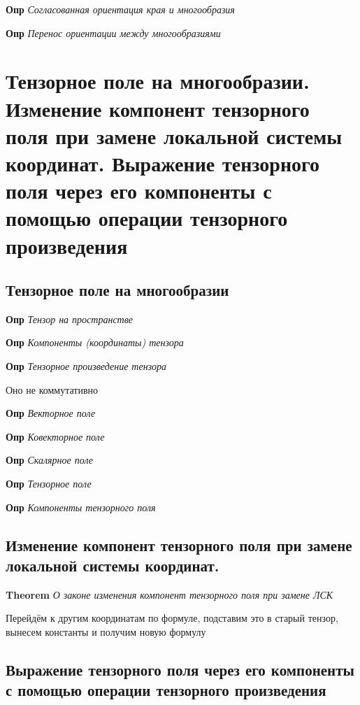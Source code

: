 \documentclass[a4paper, 14pt]{article}
\begin{document}
    \textbf{Опр} \textit{Согласованная ориентация края и многообразия}
    
    \textbf{Опр} \textit{Перенос ориентации между многообразиями}
    
    \section{Тензорное поле на многообразии.
    Изменение компонент тензорного поля при замене локальной системы координат.
    Выражение тензорного поля через его компоненты с помощью операции тензорного произведения}
    
    \subsection{Тензорное поле на многообразии}
    
    \textbf{Опр} \textit{Тензор на пространстве}
    
    \textbf{Опр} \textit{Компоненты (координаты) тензора}
    
    \textbf{Опр} \textit{Тензорное произведение тензора}
    
    Оно не коммутативно
    
    \textbf{Опр} \textit{Векторное поле}
    
    \textbf{Опр} \textit{Ковекторное поле}
    
    \textbf{Опр} \textit{Скалярное поле}
    
    \textbf{Опр} \textit{Тензорное поле}
    
    \textbf{Опр} \textit{Компоненты тензорного поля}
    
    \subsection{Изменение компонент тензорного поля при замене локальной системы координат.}
    
    \textbf{Theorem} \textit{О законе изменения компонент тензорного поля при замене ЛСК}
    
    Перейдём к другим координатам по формуле, подставим это в старый тензор, вынесем константы и получим новую формулу
    
    \subsection{Выражение тензорного поля через его компоненты с помощью операции тензорного произведения}
    
\end{document}
